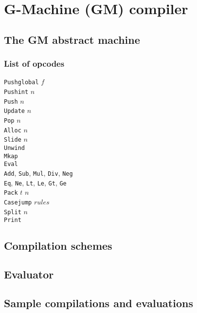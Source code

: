\section{G-Machine (GM) compiler}
\label{sec:gm}

\subsection{The GM abstract machine}
\label{sec:gm-machine}

\subsubsection{List of opcodes}
\label{sec:gm-opcodes}


\begin{description}
\item[\texttt{Pushglobal} $f$]
\item[\texttt{Pushint} $n$] 
\item[\texttt{Push} $n$] 
\item[\texttt{Update} $n$] 
\item[\texttt{Pop} $n$]   
\item[\texttt{Alloc} $n$]
\item[\texttt{Slide} $n$]
\item[\texttt{Unwind}]
\item[\texttt{Mkap}]
\item[\texttt{Eval}]
\item[\texttt{Add}, \texttt{Sub}, \texttt{Mul}, \texttt{Div}, \texttt{Neg}]
\item[\texttt{Eq}, \texttt{Ne}, \texttt{Lt}, \texttt{Le}, \texttt{Gt}, \texttt{Ge}]
\item[\texttt{Pack} $t$ $n$]
\item[\texttt{Casejump} $rules$] 
\item[\texttt{Split} $n$] 
\item[\texttt{Print}] 

\end{description}

\subsection{Compilation schemes}
\label{sec:compilation-schemes}


\subsection{Evaluator}
\label{sec:evaluator}


\subsection{Sample compilations and evaluations}
\label{sec:compiler-examples}

